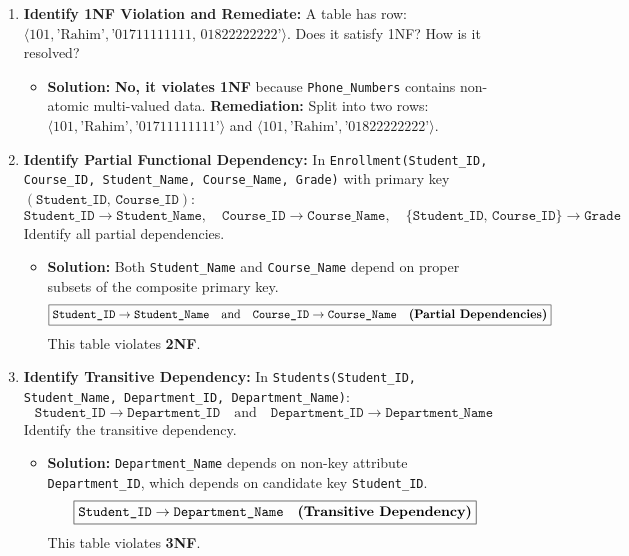 \begin{enumerate}[label=\textbf{Problem \arabic*.,resume},leftmargin=1.5cm]
\item \textbf{Identify 1NF Violation and Remediate:}
A table has row: $\langle 101, \text{'Rahim'}, \text{'01711111111, 01822222222'} \rangle$. Does it satisfy 1NF? How is it resolved?
\begin{itemize}
\item \textbf{Solution:}
\textbf{No, it violates 1NF} because \texttt{Phone\_Numbers} contains non-atomic multi-valued data.
\textbf{Remediation:} Split into two rows: $\langle 101, \text{'Rahim'}, \text{'01711111111'} \rangle$ and $\langle 101, \text{'Rahim'}, \text{'01822222222'} \rangle$.
\end{itemize}

\item \textbf{Identify Partial Functional Dependency:}
In \texttt{Enrollment(Student\_ID, Course\_ID, Student\_Name, Course\_Name, Grade)} with primary key $(\texttt{Student\_ID, Course\_ID})$:
\[ \texttt{Student\_ID} \rightarrow \texttt{Student\_Name}, \quad \texttt{Course\_ID} \rightarrow \texttt{Course\_Name}, \quad \{\texttt{Student\_ID, Course\_ID}\} \rightarrow \texttt{Grade} \]
Identify all partial dependencies.
\begin{itemize}
\item \textbf{Solution:}
Both \texttt{Student\_Name} and \texttt{Course\_Name} depend on proper subsets of the composite primary key.
\[ \boxed{\texttt{Student\_ID} \rightarrow \texttt{Student\_Name} \quad \text{and} \quad \texttt{Course\_ID} \rightarrow \texttt{Course\_Name} \quad \text{\textbf{(Partial Dependencies)}}} \]
This table violates \textbf{2NF}.
\end{itemize}

\item \textbf{Identify Transitive Dependency:}
In \texttt{Students(Student\_ID, Student\_Name, Department\_ID, Department\_Name)}:
\[ \texttt{Student\_ID} \rightarrow \texttt{Department\_ID} \quad \text{and} \quad \texttt{Department\_ID} \rightarrow \texttt{Department\_Name} \]
Identify the transitive dependency.
\begin{itemize}
\item \textbf{Solution:}
\texttt{Department\_Name} depends on non-key attribute \texttt{Department\_ID}, which depends on candidate key \texttt{Student\_ID}.
\[ \boxed{\texttt{Student\_ID} \rightarrow \texttt{Department\_Name} \quad \text{\textbf{(Transitive Dependency)}}} \]
This table violates \textbf{3NF}.
\end{itemize}


\end{enumerate}
